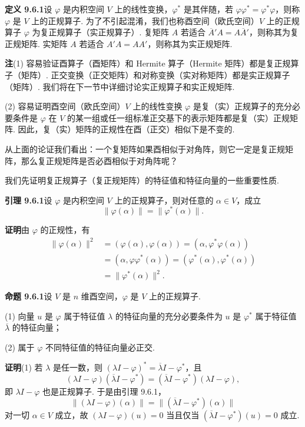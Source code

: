 \documentclass[UTF8, 12pt, fontset=fandol, oneside]{ctexart}
\begin{document}
\noindent\textbf{定义 9.6.1}\quad 设 $\varphi$ 是内积空间 $V$ 上的线性变换，$\varphi^*$ 是其伴随，若 $\varphi\varphi^*=\varphi^*\varphi$，则称 $\varphi$ 是 $V$ 上的正规算子. 为了不引起混淆，我们也称酉空间（欧氏空间）$V$ 上的正规算子 $\varphi$ 为复正规算子（实正规算子）. 复矩阵 $A$ 若适合 $\overline A'A=A\overline A'$，则称其为复正规矩阵. 实矩阵 $A$ 若适合 $A'A=AA'$，则称其为实正规矩阵.

\noindent\textbf{注}\quad (1) 容易验证酉算子（酉矩阵）和 Hermite 算子（Hermite 矩阵）都是复正规算子（矩阵）. 正交变换（正交矩阵）和对称变换（实对称矩阵）都是实正规算子（矩阵）. 我们将在下一节中详细讨论实正规算子和实正规矩阵.

(2) 容易证明酉空间（欧氏空间）$V$ 上的线性变换 $\varphi$ 是复（实）正规算子的充分必要条件是 $\varphi$ 在 $V$ 的某一组或任一组标准正交基下的表示矩阵都是复（实）正规矩阵. 因此，复（实）矩阵的正规性在酉（正交）相似下是不变的.

从上面的论证我们看出：一个复矩阵如果酉相似于对角阵，则它一定是复正规矩阵，那么复正规矩阵是否必酉相似于对角阵呢？

我们先证明复正规算子（复正规矩阵）的特征值和特征向量的一些重要性质.

\noindent\textbf{引理 9.6.1}\quad 设 $\varphi$ 是内积空间 $V$ 上的正规算子，则对任意的 $\alpha\in V$，成立
\[
  \|\varphi(\alpha)\|=\|\varphi^*(\alpha)\|.
\]

\noindent\textbf{证明}\quad 由 $\varphi$ 的正规性，有
\[
\begin{aligned}
  \|\varphi(\alpha)\|^2
  &= (\varphi(\alpha),\varphi(\alpha))=(\alpha,\varphi^*\varphi(\alpha))\\
  &= (\alpha,\varphi\varphi^*(\alpha))=(\varphi^*(\alpha),\varphi^*(\alpha))\\
  &= \|\varphi^*(\alpha)\|^2.
\end{aligned}
\]

\noindent\textbf{命题 9.6.1}\quad 设 $V$ 是 $n$ 维酉空间，$\varphi$ 是 $V$ 上的正规算子.

(1) 向量 $u$ 是 $\varphi$ 属于特征值 $\lambda$ 的特征向量的充分必要条件为 $u$ 是 $\varphi^*$ 属于特征值 $\overline\lambda$ 的特征向量；

(2) 属于 $\varphi$ 不同特征值的特征向量必正交.

\noindent\textbf{证明}\quad (1) 若 $\lambda$ 是任一数，则 $(\lambda I-\varphi)^*=\overline\lambda I-\varphi^*$，且
\[
  (\lambda I-\varphi)(\overline\lambda I-\varphi^*)=(\overline\lambda I-\varphi^*)(\lambda I-\varphi),
\]
即 $\lambda I-\varphi$ 也是正规算子. 于是由引理 9.6.1，
\[
  \|(\lambda I-\varphi)(\alpha)\|=\|(\overline\lambda I-\varphi^*)(\alpha)\|
\]
对一切 $\alpha\in V$ 成立，故 $(\lambda I-\varphi)(u)=0$ 当且仅当 $(\overline\lambda I-\varphi^*)(u)=0$ 成立.
\end{document}
